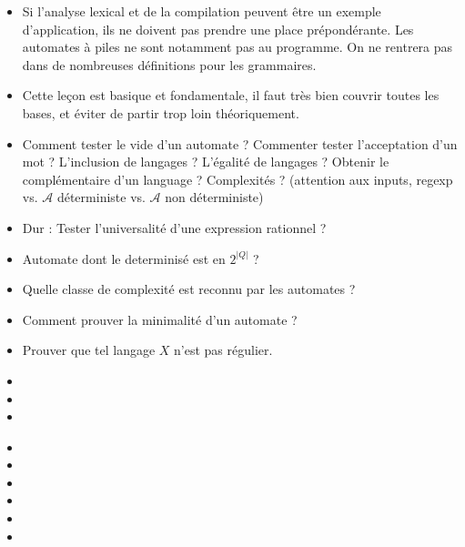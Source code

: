 \documentclass{agregfiche}
\begin{document}
\secpieges

\begin{itemize}
\item Si l'analyse lexical et de la compilation peuvent être un exemple d'application, ils ne doivent pas prendre une place prépondérante. Les automates à piles ne sont notamment pas au programme. On ne rentrera pas dans de nombreuses définitions pour les grammaires.
\item Cette leçon est basique et fondamentale, il faut très bien couvrir toutes les bases, et éviter de partir trop loin théoriquement.
\end{itemize}




\secquestionsclassiques
\begin{itemize}
\item Comment tester le vide d'un automate ? Commenter tester l'acceptation d'un mot ? L'inclusion de langages ? L'égalité de langages ? Obtenir le complémentaire d'un language ? Complexités ? (attention aux inputs, regexp vs. $\mathcal{A}$ déterministe vs. $\mathcal{A}$ non déterministe)
\item Dur : Tester l'universalité d'une expression rationnel ?
\item Automate dont le determinisé est en $2^{|Q|}$ ?
\item Quelle classe de complexité est reconnu par les automates ?
\item Comment prouver la minimalité d'un automate ?
\item Prouver que tel langage $X$ n'est pas régulier.
\end{itemize}

\secreferences
\begin{itemize}
\item 
\item 
\item 
\end{itemize}

\secdev
\begin{itemize}
\item 
\item 
\item 
\item {}
\item {}
\item {}

\end{itemize}
\end{document}
